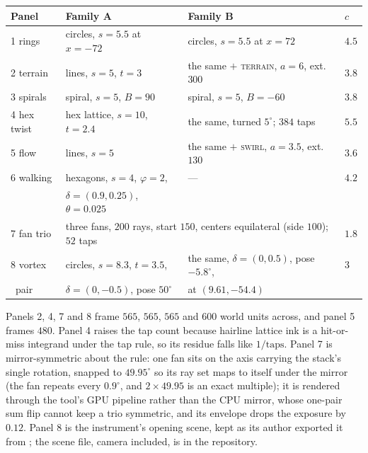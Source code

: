 \begin{center}\footnotesize
\begin{tabular}{@{}llll@{}}
  \toprule
  Panel & Family A & Family B & $c$ \\
  \midrule
  1 rings     & circles, $s{=}5.5$ at $x{=}{-}72$ & circles, $s{=}5.5$ at $x{=}72$ & $4.5$ \\
  2 terrain   & lines, $s{=}5$, $t{=}3$ & the same $+$ \textsc{terrain}, $a{=}6$, ext.\ $300$ & $3.8$ \\
  3 spirals   & spiral, $s{=}5$, $B{=}90$ & spiral, $s{=}5$, $B{=}{-}60$ & $3.8$ \\
  4 hex twist & hex lattice, $s{=}10$, $t{=}2.4$ & the same, turned $5^\circ$; $384$ taps & $5.5$ \\
  5 flow      & lines, $s{=}5$ & the same $+$ \textsc{swirl}, $a{=}3.5$, ext.\ $130$ & $3.6$ \\
  6 walking   & hexagons, $s{=}4$, $\varphi{=}2$, &---& $4.2$ \\
              & $\delta{=}(0.9,0.25)$, $\theta{=}0.025$ & & \\
  7 fan trio  & \multicolumn{2}{l}{three fans, $200$ rays, start $150$, centers equilateral (side $100$); $52$ taps} & $1.8$ \\
  8 vortex    & circles, $s{=}8.3$, $t{=}3.5$, & the same, $\delta{=}(0,0.5)$, pose $-5.8^\circ$, & $3$ \\
    \ pair    & $\delta{=}(0,{-}0.5)$, pose $50^\circ$ & at $(9.61,-54.4)$ & \\
  \bottomrule
\end{tabular}
\end{center}

\noindent Panels 2, 4, 7 and 8 frame $565$, $565$, $565$ and $600$ world units
across, and panel 5 frames $480$. Panel 4 raises the tap count
because hairline lattice ink is a hit-or-miss integrand under the tap rule, so
its residue falls like $1/\text{taps}$. Panel 7 is mirror-symmetric about
the rule: one fan sits on the axis carrying the stack's single rotation,
snapped to $49.95^\circ$ so its ray set maps to itself under the mirror
(the fan repeats every $0.9^\circ$, and $2\times49.95$ is an exact
multiple); it is rendered through the tool's GPU pipeline rather than the
CPU mirror, whose one-pair sum flip cannot keep a trio symmetric, and its
envelope drops the exposure by $0.12$. Panel 8 is the instrument's
opening scene, kept as its author
exported it from \Moire{}; the scene file, camera included, is in the
repository.

